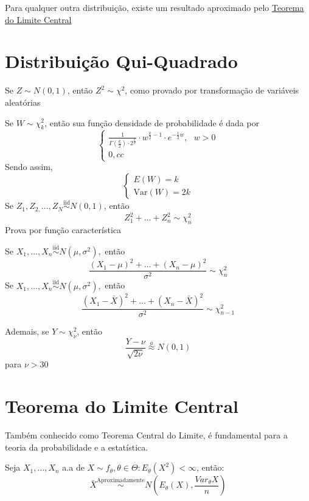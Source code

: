 \documentclass[
  letterpaper,
  DIV=11,
  numbers=noendperiod]{scrreprt}
\begin{document}
Para qualquer outra distribuição, existe um resultado aproximado pelo
\href{tlc.qmd}{Teorema do Limite Central}


\chapter{Distribuição
Qui-Quadrado}\label{distribuiuxe7uxe3o-qui-quadrado}

Se \(Z\sim N(0,1)\), então \(Z^{2}\sim \chi^2\), como provado por
transformação de variáveis aleatórias

Se \(W\sim \chi^{2}_{k}\), então sua função densidade de probabilidade é
dada por \[
\begin{cases}
\frac{1}{\Gamma\left(\frac{k}{2}\right)\cdot 2 ^{\frac{k}{2}}}\cdot w^{\frac{k}{2} -1} \cdot e^{-\frac{1}{2}w}, ~ ~~ w > 0 \\
0, cc
\end{cases}
\] Sendo assim, \[
\begin{cases}
E(W) = k \\
\mathrm{Var}(W) = 2k
\end{cases}
\] Se \(Z_{1},Z_{2,}\dots,Z_{N}\stackrel{\text{iid}}{\sim} N(0,1)\),
então \[Z_{1}^{2}+\dots+Z_{n}^{2}\sim \chi^{2}_{n}\] Prova por função
característica

Se \(X_{1},\dots,X_{n} \stackrel{\text{iid}}{\sim}N(\mu,\sigma^{2}),\)
então \[
\frac{(X_{1}-\mu)^{2}+\dots+(X_{n}-\mu)^{2}}{\sigma^{2}} \sim \chi^{2}_{n}
\] Se
\(X_{1},\dots,X_{n} \stackrel{\text{iid}}{\sim}N(\mu,\sigma^{2}),\)
então \[
\frac{(X_{1}-\bar{X})^{2}+\dots+(X_{n}-\bar{X})^{2}}{\sigma^{2}} \sim \chi^{2}_{n-1}
\]

Ademais, se \(Y\sim \chi^2_{\nu}\), então \[
\frac{Y-\nu}{\sqrt{2\nu}} \stackrel{a}{\approx} N(0,1)
\] para \(\nu > 30\)


\chapter{Teorema do Limite Central}\label{teorema-do-limite-central}

Também conhecido como Teorema Central do Limite, é fundamental para a
teoria da probabilidade e a estatística.

Seja \(X_{1},\dots,X_{n}\) a.a de
\(X\sim f_{\theta},\theta \in \Theta : E_{\theta}(X^{2}) < \infty\),
então: \[
\bar{X} \stackrel{\text{Aproximadamente}}{\sim }N\left(E_\theta(X), \frac{Var_{\theta}{X}}{n}\right)
\]
\end{document}
